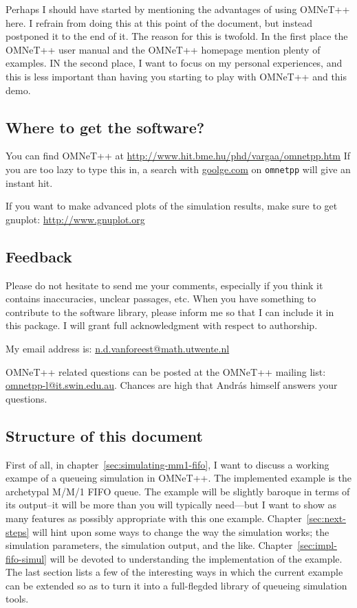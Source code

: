 \documentclass[a4paper]{article}
\begin{document}
Perhaps I should have started by mentioning the advantages of using
OMNeT++ here. I refrain from doing this at this point of the document,
but instead postponed it to the end of it. The reason for this is
twofold. In the first place the OMNeT++ user manual and the OMNeT++
homepage mention plenty of examples. IN the second place, I want to
focus on my personal experiences, and this is less important than
having you starting to play with OMNeT++ and this demo.

\subsection{Where to get the software?}
\label{sec:where-get-software}
You can find OMNeT++ at
\url{http://www.hit.bme.hu/phd/vargaa/omnetpp.htm} If you are too lazy
to type this in, a search with \url{goolge.com} on \texttt{omnetpp}
will give an instant hit. 

\noindent
If you want to make advanced plots of the simulation results, make
sure to get gnuplot: 
\url{http://www.gnuplot.org}

\subsection{Feedback}
\label{sec:feedback}
Please do not hesitate to send me your comments, especially if you
think it contains inaccuracies, unclear passages, etc. When you have
something to contribute to the software library, please inform me so
that I can include it in this package. I will grant full
acknowledgment with respect to authorship.

My email address is: \url{n.d.vanforeest@math.utwente.nl}

OMNeT++ related questions can be posted at the OMNeT++ mailing list:
\url{omnetpp-l@it.swin.edu.au}. Chances are high that Andr{\'a}s himself
answers your questions.


\subsection{Structure of this document}
\label{sec:struct-this-docum}
First of all, in chapter~\ref{sec:simulating-mm1-fifo}, I want to
discuss a working exampe of a queueing simulation in OMNeT++.  The
implemented example is the archetypal M/M/1 FIFO queue. The example
will be slightly baroque in terms of its output--it will be more than
you will typically need---but I want to show as many features as
possibly appropriate with this one example.
Chapter~\ref{sec:next-steps} will hint upon some ways to change the
way the simulation works; the simulation parameters, the simulation
output, and the like.  Chapter~\ref{sec:impl-fifo-simul} will be
devoted to understanding the implementation of the example.  The last
section lists a few of the interesting ways in which the current
example can be extended so as to turn it into a full-flegded library
of queueing simulation tools.
\end{document}
